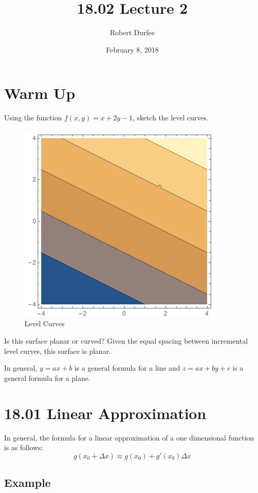 \documentclass{article}
\title{ 18.02 Lecture 2 }
\author{ Robert Durfee }
\date{ February 8, 2018 }
\begin{document}
\maketitle

\section{ Warm Up }

Using the function $f(x, y) = x + 2y - 1$, sketch the level curves.

\begin{figure}[H]
  \centering
  \includegraphics[scale=0.60]{"LevelCurves"}
  \caption{Level Curves}
\end{figure}

Is this surface planar or curved? Given the equal spacing between incremental
level curves, this surface is planar.

In general, $y = ax + b$ is a general formula for a line and $z = ax + by + c$
is a general formula for a plane.

\section{18.01 Linear Approximation}

In general, the formula for a linear approximation of a one dimensional function
is as follows:
$$ g(x_{0} + \Delta x) \approx g(x_{0}) + g'(x_{0}) \Delta x $$

\subsection{Example}
\end{document}
